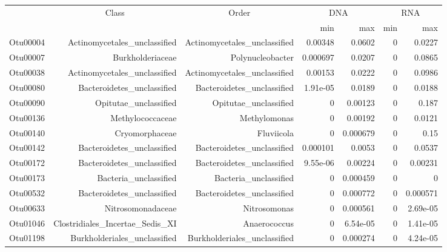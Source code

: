 \begin{table}[ht]
\centering
\begin{tabular}{crrrrrr}
  \hline
  & \multicolumn{1}{c}{Class} & \multicolumn{1}{c}{Order} & 
                      \multicolumn{2}{c}{DNA} & \multicolumn{2}{c}{RNA} \\
 & &  & min & max & min & max \\
 \hline
Otu00004 & Actinomycetales\_unclassified & Actinomycetales\_unclassified & 0.00348 & 0.0602 & 0 & 0.0227 \\ 
  Otu00007 & Burkholderiaceae & Polynucleobacter & 0.000697 & 0.0207 & 0 & 0.0865 \\ 
  Otu00038 & Actinomycetales\_unclassified & Actinomycetales\_unclassified & 0.00153 & 0.0222 & 0 & 0.0986 \\ 
  Otu00080 & Bacteroidetes\_unclassified & Bacteroidetes\_unclassified & 1.91e-05 & 0.0189 & 0 & 0.0188 \\ 
  Otu00090 & Opitutae\_unclassified & Opitutae\_unclassified & 0 & 0.00123 & 0 & 0.187 \\ 
  Otu00136 & Methylococcaceae & Methylomonas & 0 & 0.00192 & 0 & 0.0121 \\ 
  Otu00140 & Cryomorphaceae & Fluviicola & 0 & 0.000679 & 0 & 0.15 \\ 
  Otu00142 & Bacteroidetes\_unclassified & Bacteroidetes\_unclassified & 0.000101 & 0.0053 & 0 & 0.0537 \\ 
  Otu00172 & Bacteroidetes\_unclassified & Bacteroidetes\_unclassified & 9.55e-06 & 0.00224 & 0 & 0.00231 \\ 
  Otu00173 & Bacteria\_unclassified & Bacteria\_unclassified & 0 & 0.000459 & 0 & 0 \\ 
  Otu00532 & Bacteroidetes\_unclassified & Bacteroidetes\_unclassified & 0 & 0.000772 & 0 & 0.000571 \\ 
  Otu00633 & Nitrosomonadaceae & Nitrosomonas & 0 & 0.000561 & 0 & 2.69e-05 \\ 
  Otu01046 & Clostridiales\_Incertae\_Sedis\_XI & Anaerococcus & 0 & 6.54e-05 & 0 & 1.41e-05 \\ 
  Otu01198 & Burkholderiales\_unclassified & Burkholderiales\_unclassified & 0 & 0.000274 & 0 & 4.24e-05 \\ 
   \hline
\end{tabular}
\end{table}
